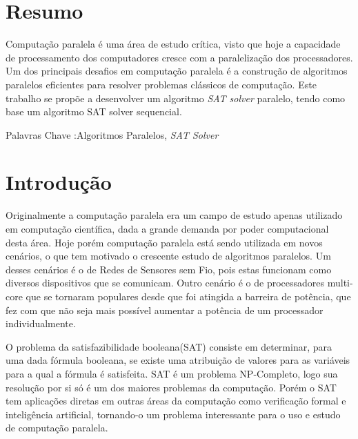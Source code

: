 \documentclass{ufsc-thesis}
\begin{document}
\pretextual%
\imprimircapa%
\imprimirfolhaderosto*%
\clearpage
\tableofcontents%


\chapter{Resumo}

Computação paralela é uma área de estudo crítica, visto que hoje
a capacidade de processamento dos computadores cresce com a paralelização dos processadores. Um
dos principais desafios em computação paralela é a construção de 
algoritmos paralelos eficientes para resolver problemas clássicos 
de computação. Este trabalho se propõe a desenvolver um algoritmo 
\textit{SAT solver} paralelo, tendo como base um algoritmo SAT solver sequencial.

Palavras Chave :Algoritmos Paralelos, \textit{SAT Solver}


\chapter{Introdução}
\label{cap:introduction}

Originalmente a computação paralela era um campo de estudo apenas 
utilizado em computação científica, dada a grande demanda por poder 
computacional desta área. Hoje porém computação paralela está sendo 
utilizada em novos cenários, o que tem motivado o crescente estudo de 
algoritmos paralelos. Um desses cenários é o de Redes de Sensores sem Fio, 
pois estas funcionam como diversos dispositivos que se 
comunicam. Outro cenário é o de processadores multi-core que se 
tornaram populares desde que foi atingida a barreira de potência, 
que fez com que não seja mais possível aumentar a potência de um 
processador individualmente\cite{patterson2012computer}.

O problema da satisfazibilidade booleana(SAT)\cite{Biere} consiste em determinar, 
para uma dada fórmula booleana, se existe uma atribuição de valores 
para as variáveis para a qual a fórmula é satisfeita. SAT é um problema 
NP-Completo, logo sua resolução por si só é um dos maiores problemas da 
computação. Porém o SAT tem aplicações diretas em outras áreas da 
computação como verificação formal e inteligência artificial, 
tornando-o um problema interessante para o uso e estudo de 
computação paralela.
\end{document}
